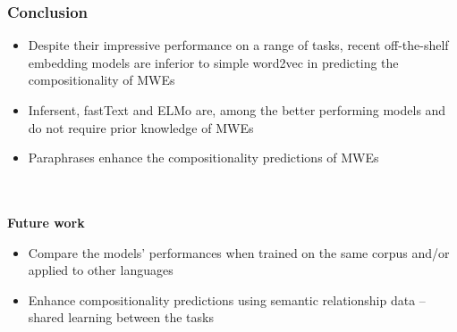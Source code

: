\documentclass{beamer}
\begin{document}
\begin{frame}[fragile] %
\frametitle{Conclusion}
\begin{itemize}
    \item Despite their impressive performance on a range of tasks, recent off-the-shelf embedding models are inferior to simple word2vec in predicting the compositionality of MWEs
    \item Infersent, fastText and ELMo are, among the better performing models and do not require prior knowledge of MWEs
    \item Paraphrases enhance the compositionality predictions of MWEs
\end{itemize} \\~\\
\textbf{Future work} \\
\begin{itemize}
    \item Compare the models' performances when trained on the same corpus and/or applied to other languages
    \item Enhance compositionality predictions using semantic relationship data -- shared learning between the tasks
\end{itemize}
\end{frame}

\end{document}

